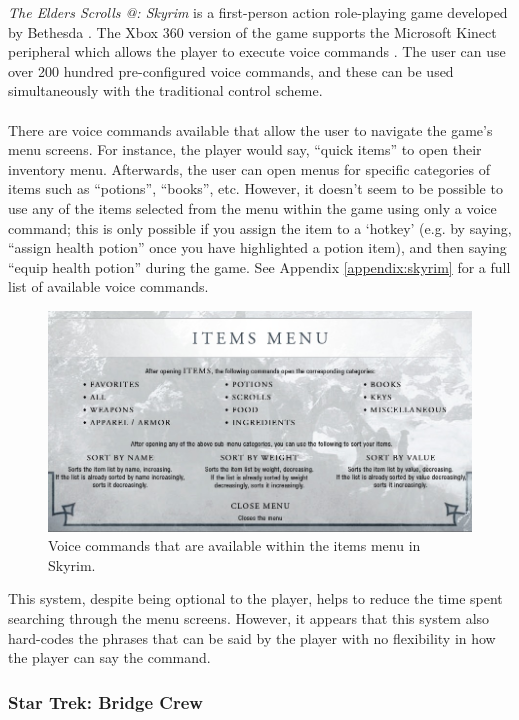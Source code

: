 \documentclass[11pt]{article}
\makeatletter
\newcommand*{\rom}[1]{\expandafter\@slowromancap\romannumeral #1@}
\makeatother
\begin{document}
\textit{The Elders Scrolls \rom{5}: Skyrim} is a first-person action role-playing game developed by Bethesda \cite{RefWorks:23}. The Xbox 360 version of the game supports the Microsoft Kinect peripheral which allows the player to execute voice commands \cite{RefWorks:24}. The user can use over 200 hundred pre-configured voice commands, and these can be used simultaneously with the traditional control scheme.
\\
\\
There are voice commands available that allow the user to navigate the game's menu screens. For instance, the player would say, ``quick items'' to open their inventory menu. Afterwards, the user can open menus for specific categories of items such as ``potions'', ``books'', etc. However, it doesn't seem to be possible to use any of the items selected from the menu within the game using only a voice command; this is only possible if you assign the item to a `hotkey' (e.g. by saying, ``assign health potion'' once you have highlighted a potion item), and then saying ``equip health potion'' during the game. See Appendix \ref{appendix:skyrim} for a full list of available voice commands.
\begin{center}
\begin{figure}[H]
  \includegraphics[width=\textwidth]{skyrim-item-commands.png}
  \caption{Voice commands that are available within the items menu in Skyrim.}
\end{figure}
\end{center}
This system, despite being optional to the player, helps to reduce the time spent searching through the menu screens. However, it appears that this system also hard-codes the phrases that can be said by the player with no flexibility in how the player can say the command.

\subsubsection{Star Trek: Bridge Crew}
\end{document}
